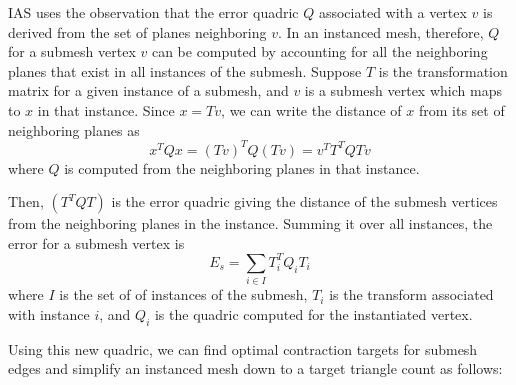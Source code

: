 


IAS uses the observation that the error quadric $Q$
associated with a vertex $v$ is derived from the set of planes
neighboring $v$. In an instanced mesh, therefore, $Q$
for a submesh vertex $v$ can be computed by accounting for all
the neighboring planes that exist in all instances of the
submesh. Suppose $T$ is the transformation matrix for a given
instance of a submesh, and $v$ is a submesh vertex which maps
to $x$ in that instance. Since $x=Tv$, we can write the
distance of $x$ from its set of neighboring planes as
\begin{equation}
x^TQx=(Tv)^TQ(Tv)=v^TT^TQTv
\end{equation}
where $Q$ is computed from the neighboring planes in that instance.

Then, $(T^TQT)$ is the error quadric giving the distance of
the submesh vertices from the neighboring planes in the
instance. Summing it over all instances, the error for a submesh
vertex is 
\begin{equation}
E_s = \sum_{i \in I}{T_i^TQ_iT_i}
\end{equation}
 where $I$ is the set of of instances of the submesh,
$T_i$ is the transform associated with instance $i$, and
$Q_i$ is the quadric computed for the instantiated vertex.

Using this new quadric, we can find
optimal contraction targets for submesh edges and simplify an instanced mesh
down to a target triangle count as follows:

